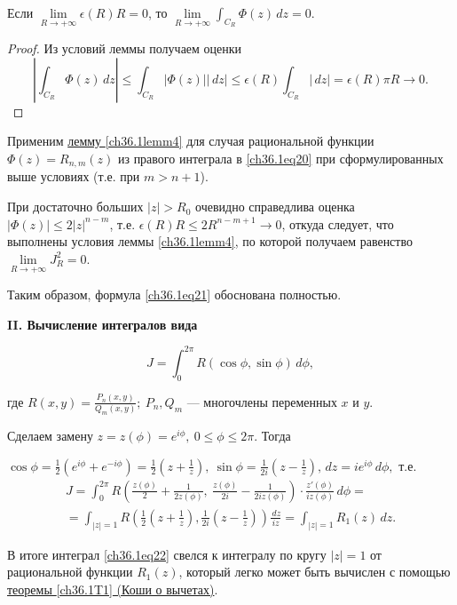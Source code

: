 \begin{leftbar}
\begin{lemm}
Если $\lim\limits_{R \to +\infty} \epsilon(R)R = 0$, то $\lim\limits_{R \to +\infty} \int_{C_R} \Phi(z)\,dz = 0$.
\end{lemm}

\begin{proof}
Из условий леммы получаем оценки
$$
\left| \int_{C_R} \Phi(z)\,dz \right| \le \int_{C_R} |\Phi(z)||\,dz| \le \epsilon(R) \int_{C_R}|\,dz| = \epsilon(R)\pi R \to 0.
$$
\end{proof}

Применим \hyperref[ch36.1lemm4]{лемму \ref{ch36.1lemm4}} для случая рациональной функции $\Phi(z) = R_{n,m}(z)$ из правого интеграла в \eqref{ch36.1eq20} при сформулированных выше условиях (т.е. при $m > n + 1$).

При достаточно больших $|z| > R_0$ очевидно справедлива оценка $|\Phi(z)| \le 2|z|^{n - m}$, т.е.
$\epsilon(R)R \le 2R^{n - m + 1} \to 0$, откуда следует, что выполнены условия леммы \ref{ch36.1lemm4}, по которой получаем равенство $\lim\limits_{R \to +\infty} J_R^2 = 0$.

Таким образом, формула \eqref{ch36.1eq21} обоснована полностью.

{\bf II. Вычисление интегралов вида}

\begin{equation} \label{ch36.1eq22}
J = \int_{0}^{2\pi} R(\cos \phi, \sin\phi)\,d\phi,
\end{equation}

где $R(x,y) = \frac{P_n(x,y)}{Q_m(x,y)}; \: P_n, Q_m$ --- многочлены переменных $x$ и $y$.

Сделаем замену $z = z(\phi) = e^{i \phi}, \: 0 \le \phi \le 2\pi$. Тогда 

$\cos\phi = \frac{1}{2} (e^{i\phi} + e^{-i\phi}) = \frac{1}{2}\left( z + \frac{1}{z}\right), \: \sin\phi = \frac{1}{2i} \left(z - \frac{1}{z} \right), \,dz = i e^{i \phi} \,d\phi,$ т.е. 
\begin{multline*}
J = \int_0^{2\pi} R\left( \frac{z(\phi)}{2} + \frac{1}{2z(\phi)}, \: \frac{z(\phi)}{2i} - \frac{1}{2iz(\phi)}\right) \cdot \frac{z'(\phi)}{iz(\phi)} \,d\phi =\\= \int_{|z| = 1} R\left( \frac{1}{2} \left( z + \frac{1}{z}\right), \frac{1}{2i}\left( z - \frac{1}{z}\right)\right)\frac{\,dz}{iz} = \int_{|z| = 1} R_1(z)\,dz.
\end{multline*}

В итоге интеграл \eqref{ch36.1eq22} свелся к интегралу по кругу $|z| = 1$ от рациональной функции $R_1(z)$, который легко может быть вычислен с помощью  \hyperref[ch36.1T1]{теоремы \ref{ch36.1T1} (Коши о вычетах)}.


\end{leftbar}
